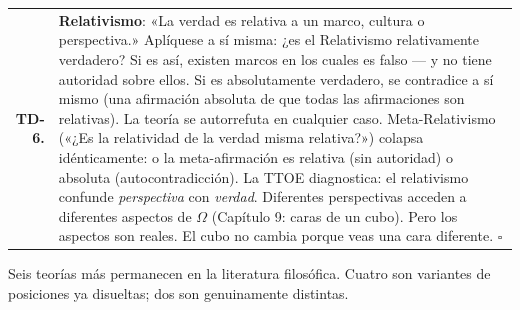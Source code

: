 \documentclass[10pt, openany, oneside]{book}
\begin{document}
{\begin{tabular}{r p{}}
\textbf{TD-6.} & \textbf{Relativismo}: «La verdad es relativa a un marco, cultura o perspectiva.» Aplíquese a sí misma: ¿es el Relativismo relativamente verdadero? Si es así, existen marcos en los cuales es falso --- y no tiene autoridad sobre ellos. Si es absolutamente verdadero, se contradice a sí mismo (una afirmación absoluta de que todas las afirmaciones son relativas). La teoría se autorrefuta en cualquier caso. Meta-Relativismo («¿Es la relatividad de la verdad misma relativa?») colapsa idénticamente: o la meta-afirmación es relativa (sin autoridad) o absoluta (autocontradicción). La TTOE diagnostica: el relativismo confunde \textit{perspectiva} con \textit{verdad}. Diferentes perspectivas acceden a diferentes aspectos de $\Omega$ (Capítulo 9: caras de un cubo). Pero los aspectos son reales. El cubo no cambia porque veas una cara diferente. $\square$ \\[0.3em]
\end{tabular}
}

\vspace{0.8em}

\noindent Seis teorías más permanecen en la literatura filosófica. Cuatro son variantes de posiciones ya disueltas; dos son genuinamente distintas.
\end{document}

